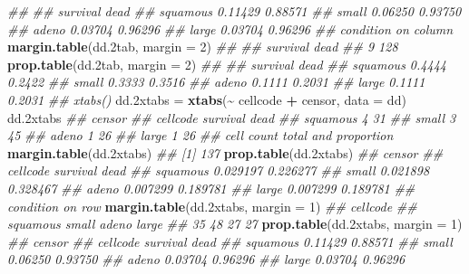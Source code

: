 \documentclass[
]{book}
\newenvironment{Shaded}{\begin{snugshade}}{\end{snugshade}}
\newcommand{\CommentTok}[1]{\textcolor[rgb]{0.56,0.35,0.01}{\textit{#1}}}
\newcommand{\DataTypeTok}[1]{\textcolor[rgb]{0.13,0.29,0.53}{#1}}
\newcommand{\DecValTok}[1]{\textcolor[rgb]{0.00,0.00,0.81}{#1}}
\newcommand{\FloatTok}[1]{\textcolor[rgb]{0.00,0.00,0.81}{#1}}
\newcommand{\KeywordTok}[1]{\textcolor[rgb]{0.13,0.29,0.53}{\textbf{#1}}}
\newcommand{\NormalTok}[1]{#1}
\newcommand{\OperatorTok}[1]{\textcolor[rgb]{0.81,0.36,0.00}{\textbf{#1}}}
\newcommand{\StringTok}[1]{\textcolor[rgb]{0.31,0.60,0.02}{#1}}
\begin{document}
\begin{Shaded}
\begin{Highlighting}[]
\CommentTok{\#\#           }
\CommentTok{\#\#            survival    dead}
\CommentTok{\#\#   squamous  0.11429 0.88571}
\CommentTok{\#\#   small     0.06250 0.93750}
\CommentTok{\#\#   adeno     0.03704 0.96296}
\CommentTok{\#\#   large     0.03704 0.96296}
\CommentTok{\#\# condition on column}
\KeywordTok{margin.table}\NormalTok{(dd}\FloatTok{.2}\NormalTok{tab, }\DataTypeTok{margin =} \DecValTok{2}\NormalTok{)}
\CommentTok{\#\# }
\CommentTok{\#\# survival     dead }
\CommentTok{\#\#        9      128}
\KeywordTok{prop.table}\NormalTok{(dd}\FloatTok{.2}\NormalTok{tab, }\DataTypeTok{margin =} \DecValTok{2}\NormalTok{)}
\CommentTok{\#\#           }
\CommentTok{\#\#            survival   dead}
\CommentTok{\#\#   squamous   0.4444 0.2422}
\CommentTok{\#\#   small      0.3333 0.3516}
\CommentTok{\#\#   adeno      0.1111 0.2031}
\CommentTok{\#\#   large      0.1111 0.2031}
\CommentTok{\#\# xtabs()}
\NormalTok{dd}\FloatTok{.2}\NormalTok{xtabs =}\StringTok{ }\KeywordTok{xtabs}\NormalTok{(}\OperatorTok{\textasciitilde{}}\StringTok{ }\NormalTok{cellcode }\OperatorTok{+}\StringTok{ }\NormalTok{censor, }\DataTypeTok{data =}\NormalTok{ dd)}
\NormalTok{dd}\FloatTok{.2}\NormalTok{xtabs}
\CommentTok{\#\#           censor}
\CommentTok{\#\# cellcode   survival dead}
\CommentTok{\#\#   squamous        4   31}
\CommentTok{\#\#   small           3   45}
\CommentTok{\#\#   adeno           1   26}
\CommentTok{\#\#   large           1   26}
\CommentTok{\#\# cell count total and proportion }
\KeywordTok{margin.table}\NormalTok{(dd}\FloatTok{.2}\NormalTok{xtabs)}
\CommentTok{\#\# [1] 137}
\KeywordTok{prop.table}\NormalTok{(dd}\FloatTok{.2}\NormalTok{xtabs)}
\CommentTok{\#\#           censor}
\CommentTok{\#\# cellcode   survival     dead}
\CommentTok{\#\#   squamous 0.029197 0.226277}
\CommentTok{\#\#   small    0.021898 0.328467}
\CommentTok{\#\#   adeno    0.007299 0.189781}
\CommentTok{\#\#   large    0.007299 0.189781}
\CommentTok{\#\# condition on row}
\KeywordTok{margin.table}\NormalTok{(dd}\FloatTok{.2}\NormalTok{xtabs, }\DataTypeTok{margin =} \DecValTok{1}\NormalTok{)}
\CommentTok{\#\# cellcode}
\CommentTok{\#\# squamous    small    adeno    large }
\CommentTok{\#\#       35       48       27       27}
\KeywordTok{prop.table}\NormalTok{(dd}\FloatTok{.2}\NormalTok{xtabs, }\DataTypeTok{margin =} \DecValTok{1}\NormalTok{)}
\CommentTok{\#\#           censor}
\CommentTok{\#\# cellcode   survival    dead}
\CommentTok{\#\#   squamous  0.11429 0.88571}
\CommentTok{\#\#   small     0.06250 0.93750}
\CommentTok{\#\#   adeno     0.03704 0.96296}
\CommentTok{\#\#   large     0.03704 0.96296}

\end{Highlighting}
\end{Shaded}
\end{document}
